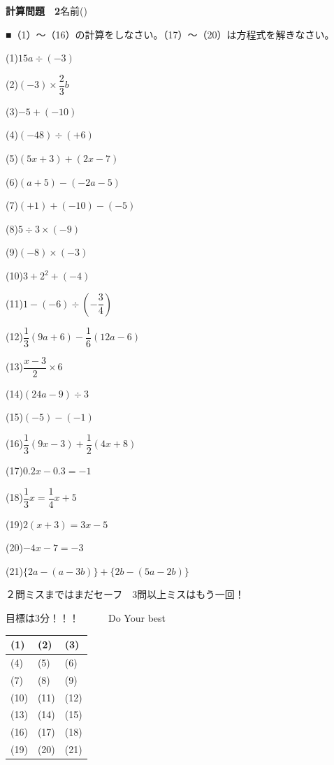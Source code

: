 \documentclass[a4paper,11pt]{ltjsarticle}
\newlength{\qcol}\setlength{\qcol}{0.47\textwidth}
\newlength{\qgap}
\newlength{\anscolw}\setlength{\anscolw}{0.30\textwidth}
\newlength{\ansh}
\newcommand{\Q}[2]{\parbox[t]{\qcol}{\raggedright (#1)\hspace{0.6em}$\displaystyle #2$}}
\newcommand{\QR}[4]{\Q{#1}{#2}\hfill\Q{#3}{#4}\par\vspace{\qgap}}
\newcommand{\anscell}[1]{\rule[-\ansdrop]{0pt}{\ansh}(#1)}
\newlength{\ansdrop}
\begin{document}
{\large\bfseries 計算問題　2}\hfill 名前(\underline{\hspace{32mm}})\par\vspace{3mm}
■（1）〜（16）の計算をしなさい。（17）〜（20）は方程式を解きなさい。\par\vspace{3mm}
\setlength{\qgap}{5.4mm}
\QR{1}{15a\div(-3)}{2}{(-3)\times\dfrac{2}{3}b}
\QR{3}{-5+(-10)}{4}{(-48)\div(+6)}
\QR{5}{(5x+3)+(2x-7)}{6}{(a+5)-(-2a-5)}
\QR{7}{(+1)+(-10)-(-5)}{8}{5\div3\times(-9)}
\QR{9}{(-8)\times(-3)}{10}{3+2^2+(-4)}
\QR{11}{1-(-6)\div\left(-\dfrac{3}{4}\right)}{12}{\dfrac{1}{3}(9a+6)-\dfrac{1}{6}(12a-6)}
\QR{13}{\dfrac{x-3}{2}\times6}{14}{(24a-9)\div3}
\QR{15}{(-5)-(-1)}{16}{\dfrac{1}{3}(9x-3)+\dfrac{1}{2}(4x+8)}
\QR{17}{0.2x-0.3=-1}{18}{\dfrac{1}{3}x=\dfrac{1}{4}x+5}
\QR{19}{2(x+3)=3x-5}{20}{-4x-7=-3}
\vspace{1mm}
\Q{21}{\{2a-(a-3b)\}+\{2b-(5a-2b)\}}\par\vspace{3mm}
{\small ２問ミスまではまだセーフ　3問以上ミスはもう一回！}\par
{\small 目標は3分！！！　　　Do Your best}\par
\vspace{2mm}
\setlength{\ansh}{9.5mm}\setlength{\ansdrop}{6mm}%
\begin{center}\begin{tabular}{|p{\anscolw}|p{\anscolw}|p{\anscolw}|}\hline
\anscell{1} & \anscell{2} & \anscell{3} \\\hline
\anscell{4} & \anscell{5} & \anscell{6} \\\hline
\anscell{7} & \anscell{8} & \anscell{9} \\\hline
\anscell{10} & \anscell{11} & \anscell{12} \\\hline
\anscell{13} & \anscell{14} & \anscell{15} \\\hline
\anscell{16} & \anscell{17} & \anscell{18} \\\hline
\anscell{19} & \anscell{20} & \anscell{21} \\\hline
\end{tabular}\end{center}
\end{document}

